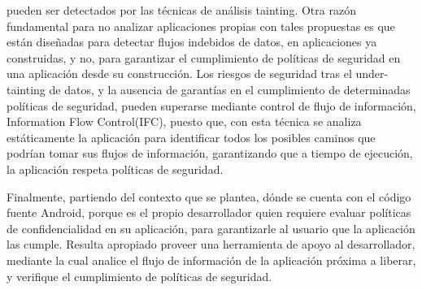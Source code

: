 pueden ser detectados por las técnicas de análisis tainting.\newline 
Otra razón fundamental para no  analizar aplicaciones propias con tales
propuestas es que están diseñadas para detectar flujos indebidos de datos, en
aplicaciones ya construidas, y no, para garantizar el cumplimiento de políticas
de seguridad en una aplicación desde su construcción.\newline 
Los riesgos de seguridad tras el under-tainting de datos, y la ausencia de garantías en el cumplimiento de determinadas políticas de seguridad, pueden
superarse mediante control de flujo de información, Information Flow
Control(IFC), puesto que, con esta técnica se analiza estáticamente la
aplicación para identificar todos los posibles caminos que podrían tomar sus
flujos de información, garantizando que a tiempo de ejecución, la
aplicación respeta políticas de seguridad.

Finalmente, partiendo del contexto que se plantea, dónde se cuenta con el código
fuente Android, porque es el propio desarrollador quien requiere evaluar
políticas de confidencialidad en su aplicación, para  garantizarle
al usuario que la aplicación las cumple. Resulta apropiado proveer una
herramienta de apoyo al desarrollador, mediante la cual analice el flujo de
información de la aplicación próxima a liberar, y verifique el cumplimiento de
políticas de seguridad.
 
















